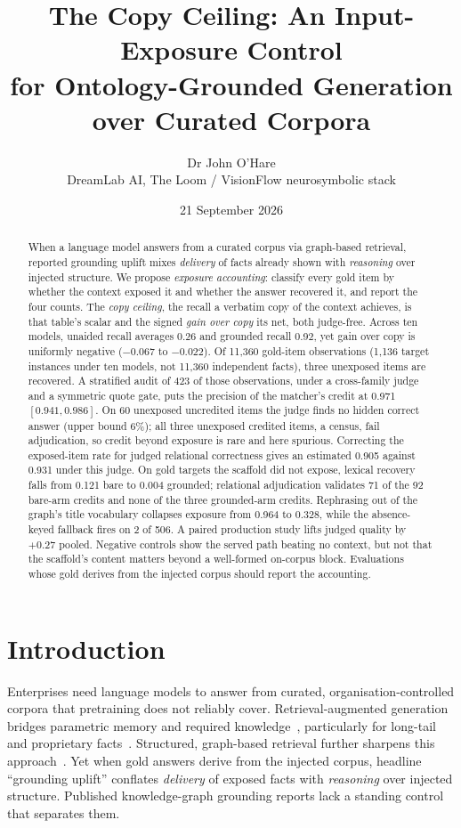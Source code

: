 \documentclass[10pt,twocolumn]{article}
\title{\vspace{-1.2cm}\bfseries The Copy Ceiling: An Input-Exposure Control\\
for Ontology-Grounded Generation over Curated Corpora}
\author{Dr John O'Hare\\ \small DreamLab AI, The Loom / VisionFlow neurosymbolic stack}
\date{21 September 2026}
\begin{document}
\maketitle

\begin{abstract}
\noindent
When a language model answers from a curated corpus via graph-based retrieval, reported grounding uplift mixes \emph{delivery} of facts already shown with \emph{reasoning} over injected structure. We propose \emph{exposure accounting}: classify every gold item by whether the context exposed it and whether the answer recovered it, and report the four counts. The \emph{copy ceiling}, the recall a verbatim copy of the context achieves, is that table's scalar and the signed \emph{gain over copy} its net, both judge-free. Across ten models, unaided recall averages 0.26 and grounded recall 0.92, yet gain over copy is uniformly negative ($-0.067$ to $-0.022$). Of 11{,}360 gold-item observations (1{,}136 target instances under ten models, not 11{,}360 independent facts), three unexposed items are recovered. A stratified audit of 423 of those observations, under a cross-family judge and a symmetric quote gate, puts the precision of the matcher's credit at 0.971 $[0.941,0.986]$. On 60 unexposed uncredited items the judge finds no hidden correct answer (upper bound 6\%); all three unexposed credited items, a census, fail adjudication, so credit beyond exposure is rare and here spurious. Correcting the exposed-item rate for judged relational correctness gives an estimated 0.905 against 0.931 under this judge. On gold targets the scaffold did not expose, lexical recovery falls from 0.121 bare to 0.004 grounded; relational adjudication validates 71 of the 92 bare-arm credits and none of the three grounded-arm credits. Rephrasing out of the graph's title vocabulary collapses exposure from 0.964 to 0.328, while the absence-keyed fallback fires on 2 of 506. A paired production study lifts judged quality by $+0.27$ pooled. Negative controls show the served path beating no context, but not that the scaffold's content matters beyond a well-formed on-corpus block. Evaluations whose gold derives from the injected corpus should report the accounting.
\end{abstract}

\section{Introduction}\label{sec:intro}
Enterprises need language models to answer from curated, organisation-controlled corpora that pretraining does not reliably cover. Retrieval-augmented generation bridges parametric memory and required knowledge~\cite{lewis2020rag,gao2023ragsurvey}, particularly for long-tail and proprietary facts~\cite{mallen2023trust}. Structured, graph-based retrieval further sharpens this approach~\cite{edge2024graphrag,guo2024lightrag,baek2023kaping,pan2024unifying}. Yet when gold answers derive from the injected corpus, headline ``grounding uplift'' conflates \emph{delivery} of exposed facts with \emph{reasoning} over injected structure. Published knowledge-graph grounding reports lack a standing control that separates them.
\end{document}
